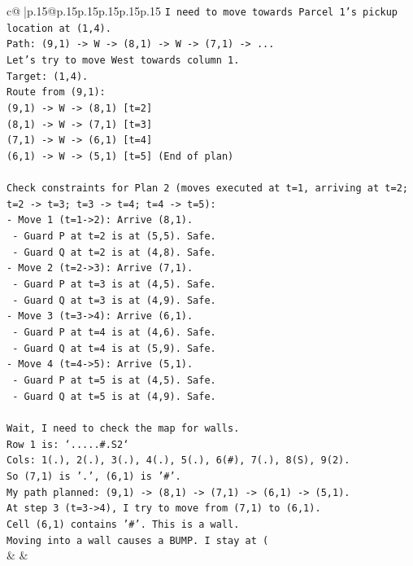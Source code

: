 \documentclass{article}
\begin{document}
{\begin{supertabular}{c@{$\;$}|p{.15\linewidth}@{}p{.15\linewidth}p{.15\linewidth}p{.15\linewidth}p{.15\linewidth}p{.15\linewidth}}
{{{\texttt{I need to move towards Parcel 1's pickup location at (1,4).} \\
\texttt{Path: (9,1) {-}> W {-}> (8,1) {-}> W {-}> (7,1) {-}> ...} \\
\texttt{Let's try to move West towards column 1.} \\
\texttt{Target: (1,4).} \\
\texttt{Route from (9,1):} \\
\texttt{(9,1) {-}> W {-}> (8,1) {[}t=2{]}} \\
\texttt{(8,1) {-}> W {-}> (7,1) {[}t=3{]}} \\
\texttt{(7,1) {-}> W {-}> (6,1) {[}t=4{]}} \\
\texttt{(6,1) {-}> W {-}> (5,1) {[}t=5{]} (End of plan)} \\
\\ 
\texttt{Check constraints for Plan 2 (moves executed at t=1, arriving at t=2; t=2 {-}> t=3; t=3 {-}> t=4; t=4 {-}> t=5):} \\
\texttt{{-} Move 1 (t=1{-}>2): Arrive (8,1).} \\
\texttt{  {-} Guard P at t=2 is at (5,5). Safe.} \\
\texttt{  {-} Guard Q at t=2 is at (4,8). Safe.} \\
\texttt{{-} Move 2 (t=2{-}>3): Arrive (7,1).} \\
\texttt{  {-} Guard P at t=3 is at (4,5). Safe.} \\
\texttt{  {-} Guard Q at t=3 is at (4,9). Safe.} \\
\texttt{{-} Move 3 (t=3{-}>4): Arrive (6,1).} \\
\texttt{  {-} Guard P at t=4 is at (4,6). Safe.} \\
\texttt{  {-} Guard Q at t=4 is at (5,9). Safe.} \\
\texttt{{-} Move 4 (t=4{-}>5): Arrive (5,1).} \\
\texttt{  {-} Guard P at t=5 is at (4,5). Safe.} \\
\texttt{  {-} Guard Q at t=5 is at (4,9). Safe.} \\
\\ 
\texttt{Wait, I need to check the map for walls.} \\
\texttt{Row 1 is: `.....\#.S2`} \\
\texttt{Cols: 1(.), 2(.), 3(.), 4(.), 5(.), 6(\#), 7(.), 8(S), 9(2).} \\
\texttt{So (7,1) is '.', (6,1) is '\#'.} \\
\texttt{My path planned: (9,1) {-}> (8,1) {-}> (7,1) {-}> (6,1) {-}> (5,1).} \\
\texttt{At step 3 (t=3{-}>4), I try to move from (7,1) to (6,1).} \\
\texttt{Cell (6,1) contains '\#'. This is a wall.} \\
\texttt{Moving into a wall causes a BUMP. I stay at (} \\
            }
        }
    }
    & & \\ \\


\end{supertabular}}
\end{document}
